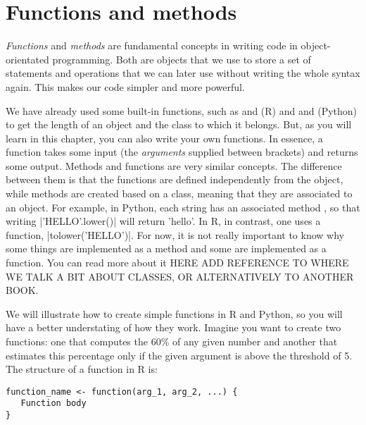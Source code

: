 \section{Functions and methods}

\emph{Functions} and \emph{methods} are fundamental concepts in
writing code in object-orientated programming. Both are objects that
we use to store a set of statements and operations that we can later
use without writing the whole syntax again. This makes our code
simpler and more powerful.

We have already used some built-in functions, such as  and
 (R) and  and  (Python) to get the length
of an object and the class to which it belongs. But, as you will learn
in this chapter, you can also write your own functions. In essence, a
function takes some input (the \emph{arguments} supplied between
brackets) and returns some output.  Methods and functions are very
similar concepts. The difference between them is that the functions
are defined independently from the object, while methods are created
based on a class, meaning that they are associated to an object. For
example, in Python, each string has an associated method ,
so that writing |'HELLO'.lower()| will return 'hello'. In R, in
contrast, one uses a function, |tolower('HELLO')|. For now, it is not
really important to know why some things are implemented as a method
and some are implemented as a function. You can read more about it
HERE ADD REFERENCE TO WHERE WE TALK A BIT ABOUT CLASSES, OR
ALTERNATIVELY TO ANOTHER BOOK.



We will illustrate how to create simple functions in R and Python, so you
will have a better understating of how they work. Imagine you want to
create two functions: one that computes the 60\% of any given number
and another that estimates this percentage only if the given argument
is above the threshold of 5. The structure of a function in R is:

\begin{verbatim}
function_name <- function(arg_1, arg_2, ...) {
   Function body 
}
\end{verbatim}

